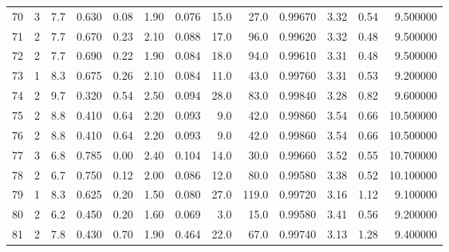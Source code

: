 \begin{tabular}{lrrrrrrrrrrrr}
70   &        3 &            7.7 &             0.630 &         0.08 &            1.90 &      0.076 &                 15.0 &                  27.0 &  0.99670 &  3.32 &       0.54 &   9.500000 \\
71   &        2 &            7.7 &             0.670 &         0.23 &            2.10 &      0.088 &                 17.0 &                  96.0 &  0.99620 &  3.32 &       0.48 &   9.500000 \\
72   &        2 &            7.7 &             0.690 &         0.22 &            1.90 &      0.084 &                 18.0 &                  94.0 &  0.99610 &  3.31 &       0.48 &   9.500000 \\
73   &        1 &            8.3 &             0.675 &         0.26 &            2.10 &      0.084 &                 11.0 &                  43.0 &  0.99760 &  3.31 &       0.53 &   9.200000 \\
74   &        2 &            9.7 &             0.320 &         0.54 &            2.50 &      0.094 &                 28.0 &                  83.0 &  0.99840 &  3.28 &       0.82 &   9.600000 \\
75   &        2 &            8.8 &             0.410 &         0.64 &            2.20 &      0.093 &                  9.0 &                  42.0 &  0.99860 &  3.54 &       0.66 &  10.500000 \\
76   &        2 &            8.8 &             0.410 &         0.64 &            2.20 &      0.093 &                  9.0 &                  42.0 &  0.99860 &  3.54 &       0.66 &  10.500000 \\
77   &        3 &            6.8 &             0.785 &         0.00 &            2.40 &      0.104 &                 14.0 &                  30.0 &  0.99660 &  3.52 &       0.55 &  10.700000 \\
78   &        2 &            6.7 &             0.750 &         0.12 &            2.00 &      0.086 &                 12.0 &                  80.0 &  0.99580 &  3.38 &       0.52 &  10.100000 \\
79   &        1 &            8.3 &             0.625 &         0.20 &            1.50 &      0.080 &                 27.0 &                 119.0 &  0.99720 &  3.16 &       1.12 &   9.100000 \\
80   &        2 &            6.2 &             0.450 &         0.20 &            1.60 &      0.069 &                  3.0 &                  15.0 &  0.99580 &  3.41 &       0.56 &   9.200000 \\
81   &        2 &            7.8 &             0.430 &         0.70 &            1.90 &      0.464 &                 22.0 &                  67.0 &  0.99740 &  3.13 &       1.28 &   9.400000 \\

\end{tabular}
